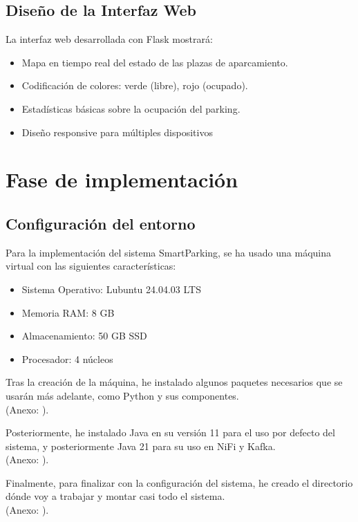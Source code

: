 \documentclass{../../../miPlantilla}
\begin{document}
\subsection{Diseño de la Interfaz Web}
La interfaz web desarrollada con Flask mostrará:
\begin{itemize}
  \item Mapa en tiempo real del estado de las plazas de aparcamiento.
  \item Codificación de colores: verde (libre), rojo (ocupado).
  \item Estadísticas básicas sobre la ocupación del parking.
  \item Diseño responsive para múltiples dispositivos
\end{itemize}

\section{Fase de implementación}

\subsection{Configuración del entorno}
Para la implementación del sistema SmartParking, se ha usado una máquina virtual con las siguientes características:
\begin{itemize}
  \item Sistema Operativo: Lubuntu 24.04.03 LTS
  \item Memoria RAM: 8 GB
  \item Almacenamiento: 50 GB SSD
  \item Procesador: 4 núcleos
\end{itemize}

Tras la creación de la máquina, he instalado algunos paquetes necesarios que se usarán más adelante, como Python y sus componentes.\\
{\small(Anexo: )}.

Posteriormente, he instalado Java en su versión 11 para el uso por defecto del sistema, y posteriormente Java 21 para su uso en NiFi y Kafka.\\
{\small(Anexo: )}.

Finalmente, para finalizar con la configuración del sistema, he creado el directorio dónde voy a trabajar y montar casi todo el sistema.\\
{\small(Anexo: )}.
\end{document}
